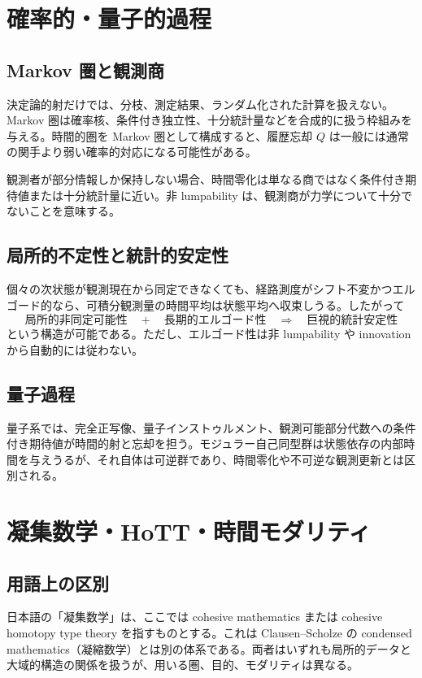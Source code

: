 \documentclass[a4paper,11pt]{ltjsarticle}
\theoremstyle{remark}
\begin{document}
\section{確率的・量子的過程}

\subsection{Markov 圏と観測商}
決定論的射だけでは、分枝、測定結果、ランダム化された計算を扱えない。Markov 圏は確率核、条件付き独立性、十分統計量などを合成的に扱う枠組みを与える\cite{Fritz2020}。時間的圏を Markov 圏として構成すると、履歴忘却 $Q$ は一般には通常の関手より弱い確率的対応になる可能性がある。

観測者が部分情報しか保持しない場合、時間零化は単なる商ではなく条件付き期待値または十分統計量に近い。非 lumpability は、観測商が力学について十分でないことを意味する。

\subsection{局所的不定性と統計的安定性}
個々の次状態が観測現在から同定できなくても、経路測度がシフト不変かつエルゴード的なら、可積分観測量の時間平均は状態平均へ収束しうる。したがって
\begin{equation}
 \text{局所的非同定可能性}
 \quad+\quad
 \text{長期的エルゴード性}
 \quad\Longrightarrow\quad
 \text{巨視的統計安定性}
\end{equation}
という構造が可能である。ただし、エルゴード性は非 lumpability や innovation から自動的には従わない。

\subsection{量子過程}
量子系では、完全正写像、量子インストゥルメント、観測可能部分代数への条件付き期待値が時間的射と忘却を担う。モジュラー自己同型群は状態依存の内部時間を与えうるが、それ自体は可逆群であり、時間零化や不可逆な観測更新とは区別される\cite{ConnesRovelli1994}。

\section{凝集数学・HoTT・時間モダリティ}

\subsection{用語上の区別}
日本語の「凝集数学」は、ここでは cohesive mathematics または cohesive homotopy type theory を指すものとする。これは Clausen--Scholze の condensed mathematics（凝縮数学）とは別の体系である。両者はいずれも局所的データと大域的構造の関係を扱うが、用いる圏、目的、モダリティは異なる。
\end{document}

